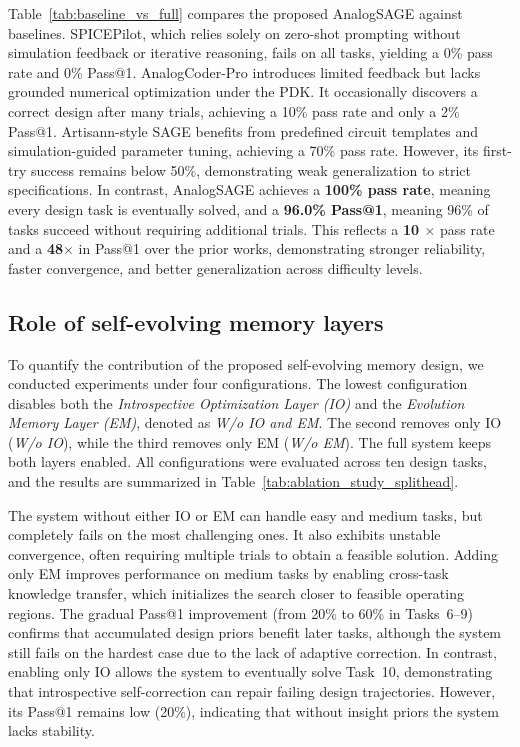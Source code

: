 \documentclass[sigconf,nonacm]{acmart}
\begin{document}
Table~\ref{tab:baseline_vs_full} compares the proposed AnalogSAGE against baselines. SPICEPilot, which relies solely on zero-shot prompting without simulation feedback or iterative reasoning, fails on all tasks, yielding a 0\% pass rate and 0\% Pass@1. AnalogCoder-Pro introduces limited feedback but lacks grounded numerical optimization under the PDK. It occasionally discovers a correct design after many trials, achieving a 10\% pass rate and only a 2\% Pass@1. Artisann-style SAGE benefits from predefined circuit templates and simulation-guided parameter tuning, achieving a 70\% pass rate. However, its first-try success remains below 50\%, demonstrating weak generalization to strict specifications. In contrast, AnalogSAGE achieves a \textbf{100\% pass rate}, meaning every design task is eventually solved, and a \textbf{96.0\% Pass@1}, meaning 96\% of tasks succeed without requiring additional trials. This reflects a \textbf{10 $\times$} pass rate and a \textbf{48$\times$} in Pass@1 over the prior works, demonstrating stronger reliability, faster convergence, and better generalization across difficulty levels.

\subsection{Role of self-evolving memory layers}


To quantify the contribution of the proposed self-evolving memory design, we conducted experiments under four configurations.  
The lowest configuration disables both the \emph{Introspective Optimization Layer (IO)} and the \emph{Evolution Memory Layer (EM)}, denoted as \emph{W/o IO and EM}.  
The second removes only IO (\emph{W/o IO}), while the third removes only EM (\emph{W/o EM}).  
The full system keeps both layers enabled. All configurations were evaluated across ten design tasks, and the results are summarized in Table~\ref{tab:ablation_study_splithead}.


The system without either IO or EM can handle easy and medium tasks, but completely fails on the most challenging ones. It also exhibits unstable convergence, often requiring multiple trials to obtain a feasible solution.
Adding only EM improves performance on medium tasks by enabling cross-task knowledge transfer, which initializes the search closer to feasible operating regions. The gradual Pass@1 improvement (from 20\% to 60\% in Tasks~6--9) confirms that accumulated design priors benefit later tasks, although the system still fails on the hardest case due to the lack of adaptive correction.
In contrast, enabling only IO allows the system to eventually solve Task~10, demonstrating that introspective self-correction can repair failing design trajectories. However, its Pass@1 remains low (20\%), indicating that without insight priors the system lacks stability.
\end{document}
